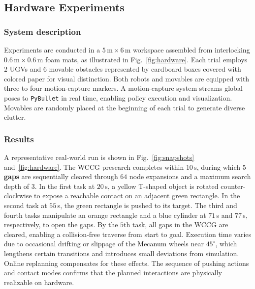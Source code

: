 \subsection{Hardware Experiments}\label{subsec:hardware}

\subsubsection{System description}\label{subsec:exp-description}
Experiments are conducted in a $5\,\mathrm{m}\times6\,\mathrm{m}$ workspace assembled from
interlocking $0.6\,\mathrm{m}\times0.6\,\mathrm{m}$ foam mats, as illustrated in
Fig.~\ref{fig:hardware}. Each trial employs $2$ UGVs and $6$ movable obstacles
represented by cardboard boxes covered with colored paper for visual distinction. Both robots and
movables are equipped with three to four motion-capture markers. A motion-capture system streams
global poses to \texttt{PyBullet} in real time, enabling policy execution and visualization.
Movables are randomly placed at the beginning of each trial to generate diverse clutter.

\subsubsection{Results}\label{subsec:exp-results}
A representative real-world run is shown in Fig.~\ref{fig:snapshots} and~\ref{fig:hardware}.
The WCCG presearch completes
within $10$\,s, during which \textbf{$5$ gaps} are sequentially cleared through $64$ node expansions and a
maximum search depth of $3$. In the first task at $20$\,s, a yellow T-shaped object is rotated
counter-clockwise to expose a reachable contact on an adjacent green rectangle. In the second task
at $55$\,s, the green rectangle is pushed to its target. The third and fourth tasks manipulate an
orange rectangle and a blue cylinder at $71$\,s and $77$\,s, respectively, to open the
gaps. By the $5$th task, all gaps in the WCCG are cleared, enabling a collision-free traverse from
start to goal. Execution time varies due to occasional drifting or slippage of the Mecanum wheels
near $45^\circ$, which lengthens certain transitions and introduces small deviations from simulation.
Online replanning compensates for these effects. The sequence of pushing actions and contact modes
confirms that the planned interactions are physically realizable on hardware.



